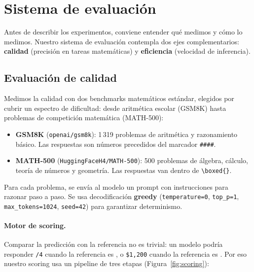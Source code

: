 \documentclass[11pt,a4paper]{article}
\begin{document}
\section{Sistema de evaluaci\'on}
\label{sec:eval-system}

Antes de describir los experimentos, conviene entender qu\'e medimos y
c\'omo lo medimos. Nuestro sistema de evaluaci\'on contempla dos ejes
complementarios: \textbf{calidad} (precisi\'on en tareas matem\'aticas)
y \textbf{eficiencia} (velocidad de inferencia).

\subsection{Evaluaci\'on de calidad}

Medimos la calidad con dos benchmarks matem\'aticos est\'andar,
elegidos por cubrir un espectro de dificultad: desde aritm\'etica
escolar (GSM8K) hasta problemas de competici\'on matem\'atica
(MATH-500):

\begin{itemize}[leftmargin=2em]
  \item \textbf{GSM8K} (\texttt{openai/gsm8k}): 1\,319 problemas de
    aritm\'etica y razonamiento b\'asico. Las respuestas son n\'umeros
    precedidos del marcador \texttt{\#\#\#\#}.
  \item \textbf{MATH-500} (\texttt{HuggingFaceH4/MATH-500}): 500 problemas
    de \'algebra, c\'alculo, teor\'ia de n\'umeros y geometr\'ia. Las
    respuestas van dentro de \texttt{\textbackslash boxed\{\}}.
\end{itemize}

Para cada problema, se env\'ia al modelo un prompt con instrucciones
para razonar paso a paso. Se usa decodificaci\'on \textbf{greedy}
(\texttt{temperature=0}, \texttt{top\_p=1}, \texttt{max\_tokens=1024},
\texttt{seed=42}) para garantizar determinismo.

\paragraph{Motor de scoring.}
Comparar la predicci\'on con la referencia no es trivial: un modelo
podr\'ia responder \texttt{/4\textquotedbl} cuando la referencia es
\texttt{\textquotedbl}, o \texttt{\textquotedbl \$1,200\textquotedbl} cuando la referencia es
\texttt{\textquotedbl}. Por eso nuestro scoring usa un pipeline de tres etapas
(Figura~\ref{fig:scoring}):
\end{document}
